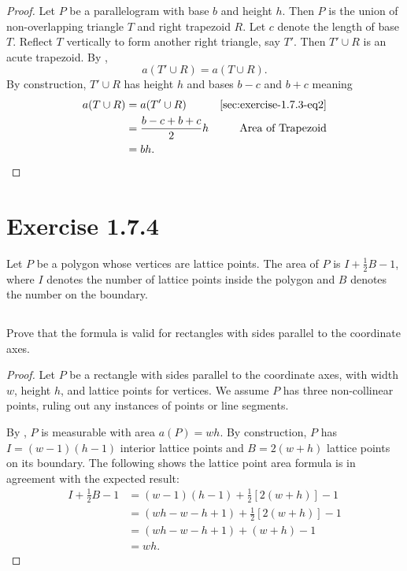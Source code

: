 \documentclass{report}
\begin{document}
\begin{proof}
  \divider

  Let $P$ be a parallelogram with base $b$ and height $h$.
  Then $P$ is the union of non-overlapping triangle $T$ and right trapezoid $R$.
  Let $c$ denote the length of base $T$.
  Reflect $T$ vertically to form another right triangle, say $T'$.
  Then $T' \cup R$ is an acute trapezoid.
  By ,
    \begin{equation}
      \label{sec:exercise-1.7.3-eq2}
      \tag{3.2}
      a(T' \cup R) = a(T \cup R).
    \end{equation}
  By construction, $T' \cup R$ has height $h$ and bases $b - c$ and $b + c$
    meaning
    \begin{align*}
      a(T \cup R)
        & = a(T' \cup R) & \eqref{sec:exercise-1.7.3-eq2} \\
        & = \frac{b - c + b + c}{2}h & \text{Area of Trapezoid} \\
        & = bh.
    \end{align*}

\end{proof}

\section{Exercise 1.7.4}%
\label{sec:exercise-1.7.4}

Let $P$ be a polygon whose vertices are lattice points.
The area of $P$ is $I + \frac{1}{2}B - 1$, where $I$ denotes the number of
  lattice points inside the polygon and $B$ denotes the number on the boundary.

\subsection{}%
\label{sub:exercise-1.7.4a}

Prove that the formula is valid for rectangles with sides parallel to the
  coordinate axes.

\begin{proof}

  Let $P$ be a rectangle with sides parallel to the coordinate axes, with width
    $w$, height $h$, and lattice points for vertices.
  We assume $P$ has three non-collinear points, ruling out any instances of
    points or line segments.

  By , $P$ is measurable with area $a(P) = wh$.
  By construction, $P$ has $I = (w - 1)(h - 1)$ interior lattice points and
    $B = 2(w + h)$ lattice points on its boundary.
  The following shows the lattice point area formula is in agreement with
    the expected result:
    \begin{align*}
      I + \frac{1}{2}B - 1
        & = (w - 1)(h - 1) + \frac{1}{2}\left[ 2(w + h) \right] - 1 \\
        & = (wh - w - h + 1) + \frac{1}{2}\left[ 2(w + h) \right] - 1 \\
        & = (wh - w - h + 1) + (w + h) - 1 \\
        & = wh.
    \end{align*}

\end{proof}
\end{document}
